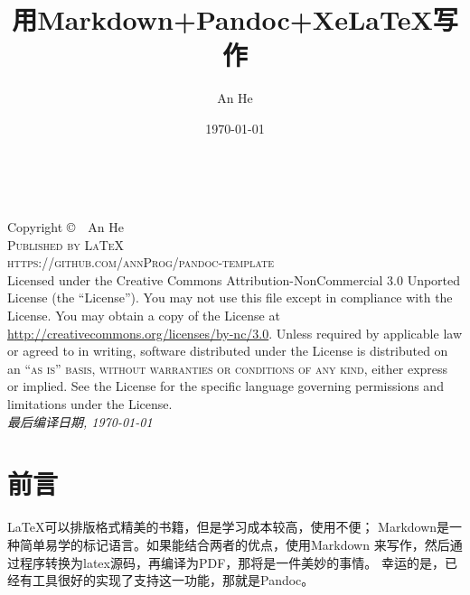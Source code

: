 \documentclass[fancyhdr,bookmark]{ctexbook}
\title{用Markdown+Pandoc+XeLaTeX写作}
\author{An He}
\date{\today}
\begin{document}
\frontmatter

\begingroup
\thispagestyle{empty}
\vfill
\endgroup
{}

\newpage
~\vfill
\thispagestyle{empty}

\noindent Copyright \copyright\ \the\year\  An He\\ %

\noindent \textsc{Published by \LaTeX}\\ %
\noindent \textsc{https://github.com/annProg/pandoc-template}\\ %

\noindent Licensed under the Creative Commons Attribution-NonCommercial 3.0 Unported License (the ``License''). You may not use this file except in compliance with the License. You may obtain a copy of the License at \url{http://creativecommons.org/licenses/by-nc/3.0}. Unless required by applicable law or agreed to in writing, software distributed under the License is distributed on an \textsc{``as is'' basis, without warranties or conditions of any kind}, either express or implied. See the License for the specific language governing permissions and limitations under the License.\\ %

\noindent \textit{最后编译日期, \today\ \currenttime } %


    
\chapter*{前言}
LaTeX可以排版格式精美的书籍，但是学习成本较高，使用不便；
Markdown是一种简单易学的标记语言。如果能结合两者的优点，使用Markdown
来写作，然后通过程序转换为latex源码，再编译为PDF，那将是一件美妙的事情。
幸运的是，已经有工具很好的实现了支持这一功能，那就是Pandoc。
\end{document}

